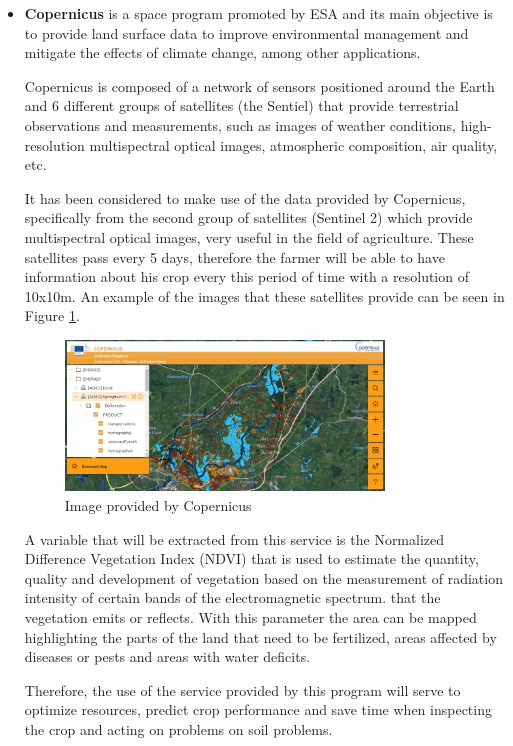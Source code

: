\begin{itemize}
    \item \textbf{Copernicus} is a space program promoted by ESA and its main objective is to provide land surface data to improve environmental management and mitigate the effects of climate change, among other applications.
    
    Copernicus is composed of a network of sensors positioned around the Earth and 6 different groups of satellites (the Sentiel) that provide terrestrial observations and measurements, such as images of weather conditions, high-resolution multispectral optical images, atmospheric composition, air quality, etc.
    
    It has been considered to make use of the data provided by Copernicus, specifically from the second group of satellites (Sentinel 2) which provide multispectral optical images, very useful in the field of agriculture. These satellites pass every 5 days, therefore the farmer will be able to have information about his crop every this period of time with a resolution of 10x10m. An example of the images that these satellites provide can be seen in Figure \ref{fig:copernicus}.
    
    \begin{figure}
        \centering
        \includegraphics[width=0.8\textwidth]{images/copernicus.jpeg}
        \caption{Image provided by Copernicus}
        \label{fig:copernicus}
    \end{figure} 
    
    A variable that will be extracted from this service is the Normalized Difference Vegetation Index (NDVI) that is used to estimate the quantity, quality and development of vegetation based on the measurement of radiation intensity of certain bands of the electromagnetic spectrum. that the vegetation emits or reflects. With this parameter the area can be mapped highlighting the parts of the land that need to be fertilized, areas affected by diseases or pests and areas with water deficits.
    
    Therefore, the use of the service provided by this program will serve to optimize resources, predict crop performance and save time when inspecting the crop and acting on problems on soil problems.
    
\end{itemize}
